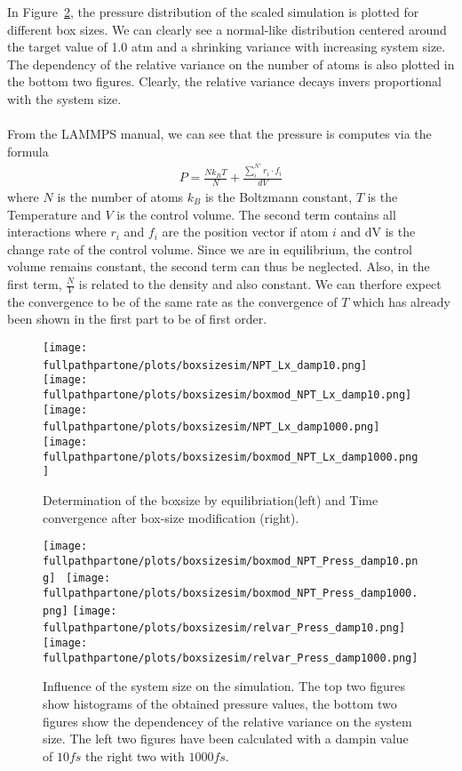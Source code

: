 \documentclass[10pt,a4paper]{report}
\def \fullpathpartone {/home/lukas/Desktop/project/independence/atomistic_modeling/exam/1_three-dimensional_atomic_system}
\begin{document}
In Figure~\ref{fig:pressure_over_boxsize}, the pressure distribution of the scaled simulation is plotted for different box sizes. We can clearly see a normal-like distribution centered around the target value of 1.0 atm and a shrinking variance with increasing system size.\\
The dependency of the relative variance on the number of atoms is also plotted in the bottom two figures. Clearly, the relative variance decays invers proportional with the system size.\\
 \\
From the LAMMPS manual, we can see that the pressure is computes via the formula
\begin{align}
P=\frac{N k_B T}{N}+\frac{\sum_i^{N'}r_i\cdot f_i}{dV}
\end{align}
where $N$ is the number of atoms $k_B$ is the Boltzmann constant, $T$ is the Temperature and $V$ is the control volume. The second term contains all interactions where $r_i$ and $f_i$ are the position vector if atom $i$ and dV is the change rate of the control volume. Since we are in equilibrium, the control volume remains constant, the second term can thus be neglected. Also, in the first term, $\frac{N}{V}$ is related to the density and also constant. We can therfore expect the convergence to be of the same rate as the convergence of $T$ which has already been shown in the first part to be of first order.


\begin{center}
\begin{figure}[h]
\texttt{[image: \\fullpathpartone/plots/boxsizesim/NPT\_Lx\_damp10.png]}~
\texttt{[image: \\fullpathpartone/plots/boxsizesim/boxmod\_NPT\_Lx\_damp10.png]}
\texttt{[image: \\fullpathpartone/plots/boxsizesim/NPT\_Lx\_damp1000.png]}~
\texttt{[image: \\fullpathpartone/plots/boxsizesim/boxmod\_NPT\_Lx\_damp1000.png]}
\caption[aaa]{Determination of the boxsize by equilibriation(left) and Time convergence after box-size modification (right). }
\label{fig:p1_boxsize}
\end{figure}
\end{center}


\begin{center}
\begin{figure}[h]
\texttt{[image: \\fullpathpartone/plots/boxsizesim/boxmod\_NPT\_Press\_damp10.png]}~
\texttt{[image: \\fullpathpartone/plots/boxsizesim/boxmod\_NPT\_Press\_damp1000.png]}
\texttt{[image: \\fullpathpartone/plots/boxsizesim/relvar\_Press\_damp10.png]}~
\texttt{[image: \\fullpathpartone/plots/boxsizesim/relvar\_Press\_damp1000.png]}
\caption[aaa]{Influence of the system size on the simulation. The top two figures show histograms of the obtained pressure values, the bottom two figures show the dependencey of the relative variance on the system size. The left two figures have been calculated with a dampin value of $10 fs$ the right two with $1000 fs$.}
\label{fig:pressure_over_boxsize}
\end{figure}
\end{center}
\end{document}
